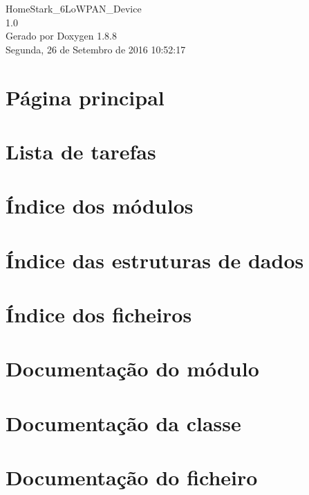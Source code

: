 \documentclass[twoside]{book}
\newcommand{\+}{\discretionary{\mbox{\scriptsize$\hookleftarrow$}}{}{}}
\newcommand{\clearemptydoublepage}{%
  \newpage{\pagestyle{empty}\cleardoublepage}%
}
\begin{document}
\hypersetup{pageanchor=false,
             bookmarks=true,
             bookmarksnumbered=true,
             pdfencoding=unicode
            }
\begin{titlepage}
\vspace*{7cm}
\begin{center}%
{\Large Home\+Stark\+\_\+6\+Lo\+W\+P\+A\+N\+\_\+\+Device \\[1ex]\large 1.\+0 }\\
\vspace*{1cm}
{\large Gerado por Doxygen 1.8.8}\\
\vspace*{0.5cm}
{\small Segunda, 26 de Setembro de 2016 10:52:17}\\
\end{center}
\end{titlepage}
\clearemptydoublepage
\tableofcontents
\clearemptydoublepage
{}
\hypersetup{pageanchor=true}

\chapter{Página principal}
\label{index}\hypertarget{index}{}
\chapter{Lista de tarefas}
\label{todo}
\hypertarget{todo}{}

\chapter{Índice dos módulos}

\chapter{Índice das estruturas de dados}

\chapter{Índice dos ficheiros}

\chapter{Documentação do módulo}


\chapter{Documentação da classe}




\chapter{Documentação do ficheiro}










\newpage
{}
{}
\printindex
\end{document}
